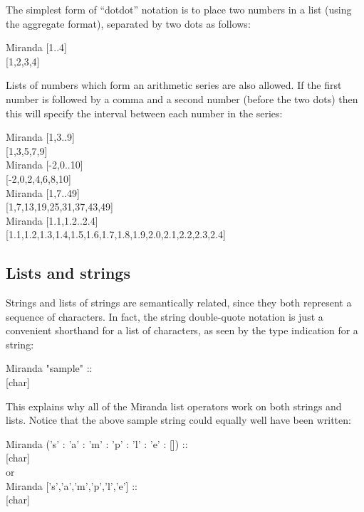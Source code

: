 \documentclass[11pt]{article}
\begin{document}
The simplest form of “dotdot” notation is to place two numbers in a list (using the
aggregate format), separated by two dots as follows:

\begin{tcolorbox}
Miranda [1..4]\\
{[1,2,3,4]}
\end{tcolorbox}

Lists of numbers which form an arithmetic series are also allowed. If the first
number is followed by a comma and a second number (before the two dots) then
this will specify the interval between each number in the series:

\begin{tcolorbox}
Miranda [1,3..9]\\
{[1,3,5,7,9]}\\
Miranda [-2,0..10]\\
{[-2,0,2,4,6,8,10]}\\
Miranda [1,7..49]\\
{[1,7,13,19,25,31,37,43,49]}\\
Miranda [1.1,1.2..2.4]\\
{[1.1,1.2,1.3,1.4,1.5,1.6,1.7,1.8,1.9,2.0,2.1,2.2,2.3,2.4]}
\end{tcolorbox}

\subsection{Lists and strings}

Strings and lists of strings are semantically related, since they both represent a
sequence of characters. In fact, the string double-quote notation is just a convenient
shorthand for a list of characters, as seen by the type indication for a string:

\begin{tcolorbox}
Miranda "sample" ::\\
{[char]}
\end{tcolorbox}

This explains why all of the Miranda list operators work on both strings and lists.
Notice that the above sample string could equally well have been written:

\begin{tcolorbox}
Miranda (’s’ : ’a’ : ’m’ : ’p’ : ’l’ : ’e’ : []) ::\\
{[char]}\\
or\\
Miranda [’s’,’a’,’m’,’p’,’l’,’e’] ::\\
 {[char]}
\end{tcolorbox}
\end{document}
